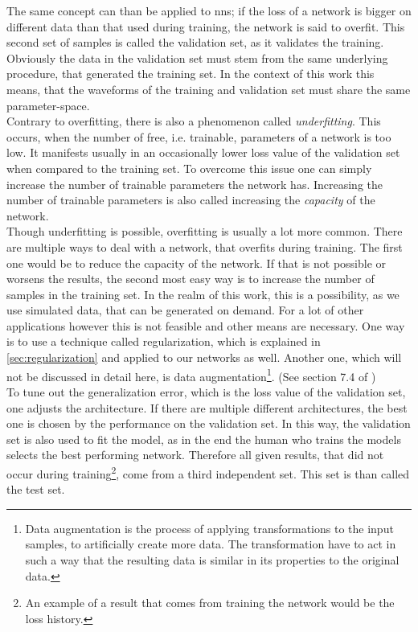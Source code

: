 The same concept can than be applied to \gls{nns}; if the loss of a network is bigger on different data than that used during training, the network is said to overfit. This second set of samples is called the validation set, as it validates the training. Obviously the data in the validation set must stem from the same underlying procedure, that generated the training set. In the context of this work this means, that the waveforms of the training and validation set must share the same parameter-space.\\
Contrary to overfitting, there is also a phenomenon called \emph{underfitting}. This occurs, when the number of free, i.e. trainable, parameters of a network is too low. It manifests usually in an occasionally lower loss value of the validation set when compared to the training set. To overcome this issue one can simply increase the number of trainable parameters the network has. Increasing the number of trainable parameters is also called increasing the \emph{capacity} of the network.\\
Though underfitting is possible, overfitting is usually a lot more common. There are multiple ways to deal with a network, that overfits during training. The first one would be to reduce the capacity of the network. If that is not possible or worsens the results, the second most easy way is to increase the number of samples in the training set. In the realm of this work, this is a possibility, as we use simulated data, that can be generated on demand. For a lot of other applications however this is not feasible and other means are necessary. One way is to use a technique called regularization, which is explained in \autoref{sec:regularization} and applied to our networks as well. Another one, which will not be discussed in detail here, is data augmentation\footnote{Data augmentation is the process of applying transformations to the input samples, to artificially create more data. The transformation have to act in such a way that the resulting data is similar in its properties to the original data.}. (See section 7.4 of \cite{deep_learning_book})\\
To tune out the generalization error, which is the loss value of the validation set, one adjusts the architecture. If there are multiple different architectures, the best one is chosen by the performance on the validation set. In this way, the validation set is also used to fit the model, as in the end the human who trains the models selects the best performing network. Therefore all given results, that did not occur during training\footnote{An example of a result that comes from training the network would be the loss history.}, come from a third independent set. This set is than called the test set.\medskip\\
